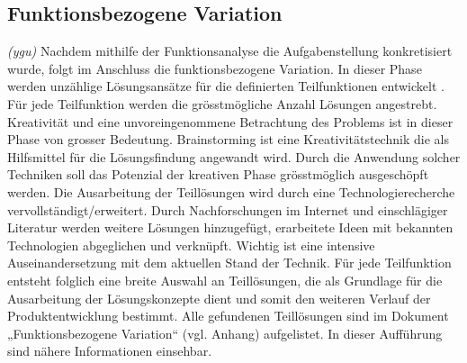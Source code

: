 \subsection{Funktionsbezogene Variation}
\label{funktionsbez_var}
\textit{(ygu)} Nachdem mithilfe der Funktionsanalyse die Aufgabenstellung konkretisiert wurde, folgt im Anschluss die funktionsbezogene Variation. In dieser Phase werden unzählige Lösungsansätze für die definierten Teilfunktionen entwickelt \cite{pahl}. Für jede Teilfunktion werden die grösstmögliche Anzahl Lösungen angestrebt.
\newline
Kreativität und eine unvoreingenommene Betrachtung des Problems ist in dieser Phase von grosser Bedeutung. Brainstorming ist eine Kreativitätstechnik die als Hilfsmittel für die Lösungsfindung angewandt wird. Durch die Anwendung solcher Techniken soll das Potenzial der kreativen Phase grösstmöglich ausgeschöpft werden.
\newline
Die Ausarbeitung der Teillösungen wird durch eine Technologierecherche vervollständigt/erweitert. Durch Nachforschungen im Internet und einschlägiger Literatur werden weitere Lösungen hinzugefügt, erarbeitete Ideen mit bekannten Technologien abgeglichen und verknüpft. Wichtig ist eine intensive Auseinandersetzung mit dem aktuellen Stand der Technik.
\newline
Für jede Teilfunktion entsteht folglich eine breite Auswahl an Teillösungen, die als Grundlage für die Ausarbeitung der Lösungskonzepte dient und somit den weiteren Verlauf der Produktentwicklung bestimmt. Alle gefundenen Teillösungen sind im Dokument „Funktionsbezogene Variation“ (vgl. Anhang) aufgelistet. In dieser Aufführung sind nähere Informationen einsehbar.
